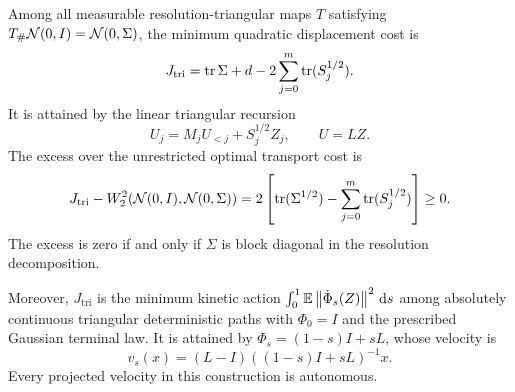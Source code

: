 \begin{theorem}\label{thm:price}
Among all measurable resolution-triangular maps $T$ satisfying $T_{\#}\mathcal N(0,I)=\mathcal N(0,\Sigma)$, the minimum quadratic displacement cost is
\begin{equation}\label{eq:triangular-cost}
 J_{\mathrm{tri}}=\operatorname{tr}\Sigma+d-2\sum_{j=0}^m\operatorname{tr}(S_j^{1/2}).
\end{equation}
It is attained by the linear triangular recursion
\begin{equation}\label{eq:gaussian-triangular-map}
 U_j=M_jU_{<j}+S_j^{1/2}Z_j,\qquad U=LZ.
\end{equation}
The excess over the unrestricted optimal transport cost is
\begin{equation}\label{eq:transport-premium}
 J_{\mathrm{tri}}-W_2^2(\mathcal N(0,I),\mathcal N(0,\Sigma))
 =2\left[\operatorname{tr}(\Sigma^{1/2})-\sum_{j=0}^m\operatorname{tr}(S_j^{1/2})\right]\ge0.
\end{equation}
The excess is zero if and only if $\Sigma$ is block diagonal in the resolution decomposition.

Moreover, $J_{\mathrm{tri}}$ is the minimum kinetic action
$\int_0^1\mathbb E\left\lVert\dot\Phi_s(Z)\right\rVert^2\,\mathrm d s$ among absolutely continuous triangular deterministic paths with $\Phi_0=I$ and the prescribed Gaussian terminal law. It is attained by $\Phi_s=(1-s)I+sL$, whose velocity is
\begin{equation}\label{eq:autonomous-gaussian-flow}
 v_s(x)=(L-I)((1-s)I+sL)^{-1}x.
\end{equation}
Every projected velocity in this construction is autonomous.
\end{theorem}
